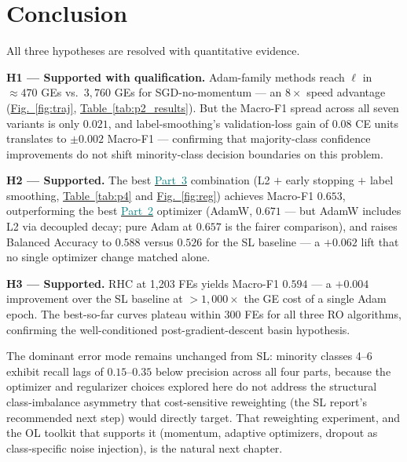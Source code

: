 \documentclass[conference]{IEEEtran}
\newcommand{\figref}[1]{\hyperref[#1]{\textcolor{denim_comp}{Fig.~\ref*{#1}}}}
\newcommand{\tabref}[1]{\hyperref[#1]{\textcolor{sage}{Table~\ref*{#1}}}}
\newcommand{\partref}[2]{\hyperref[#2]{\textcolor{teal}{Part~#1}}}
\begin{document}
\section{Conclusion}\label{sec:conclusion}

All three hypotheses are resolved with quantitative evidence.

\textbf{H1 --- Supported with qualification.}
Adam-family methods reach $\ell$ in ${\approx}470$ GEs vs.\ $3{,}760$ GEs
for SGD-no-momentum --- an $8\times$ speed advantage
(\figref{fig:traj}, \tabref{tab:p2_results}).
But the Macro-F1 spread across all seven variants is only $0.021$,
and label-smoothing's validation-loss gain of $0.08$ CE units translates to
$\pm 0.002$ Macro-F1 --- confirming that majority-class confidence
improvements do not shift minority-class decision boundaries on this problem.

\textbf{H2 --- Supported.}
The best \partref{3}{sec:p3} combination (L2 $+$ early stopping $+$ label smoothing,
\tabref{tab:p4} and \figref{fig:reg})
achieves Macro-F1 $0.653$, outperforming the best \partref{2}{sec:p2} optimizer
(AdamW, $0.671$ --- but AdamW includes L2 via decoupled decay;
pure Adam at $0.657$ is the fairer comparison),
and raises Balanced Accuracy to $0.588$ versus $0.526$ for the SL baseline ---
a $+0.062$ lift that no single optimizer change matched alone.

\textbf{H3 --- Supported.}
RHC at 1{,}203 FEs yields Macro-F1 $0.594$ --- a $+0.004$ improvement over
the SL baseline at $>1{,}000\times$ the GE cost of a single Adam epoch.
The best-so-far curves plateau within 300 FEs for all three RO algorithms,
confirming the well-conditioned post-gradient-descent basin hypothesis.

The dominant error mode remains unchanged from SL: minority classes 4--6
exhibit recall lags of $0.15$--$0.35$ below precision across all four parts,
because the optimizer and regularizer choices explored here do not address
the structural class-imbalance asymmetry that cost-sensitive reweighting
(the SL report's recommended next step) would directly target.
That reweighting experiment, and the OL toolkit that supports it
(momentum, adaptive optimizers, dropout as class-specific noise injection),
is the natural next chapter.

\end{document}
